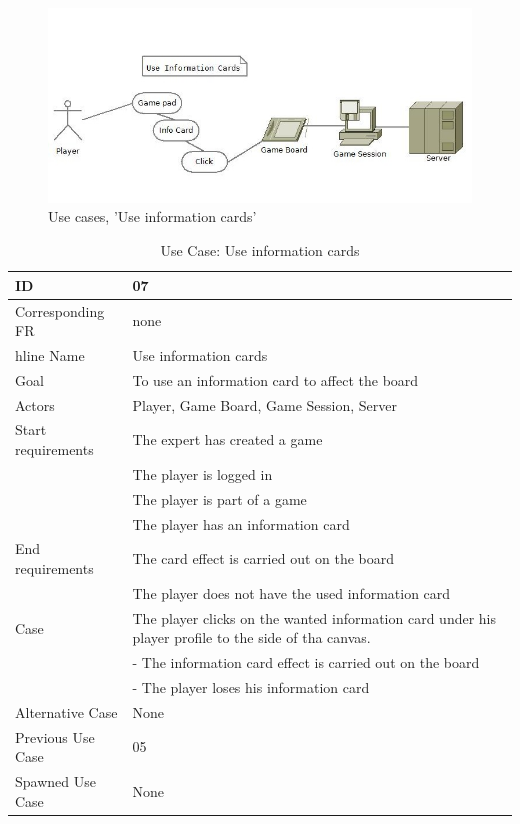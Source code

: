 \begin{figure}[H]
  \centering
    \includegraphics[width=1.0\textwidth]{img/useinfocards.jpg}
  \caption{Use cases, 'Use information cards'} 
  \label{fig:useinformationcards}
\end{figure}


\begin{table}[H]
\begin{tabular}{|l|p{14cm}|}
\hline
	\textbf{ID} & \textbf{07}\\ \hline
	Corresponding FR & none\\hline
	Name & Use information cards\\ \hline
	Goal & To use an information card to affect the board\\ \hline
	Actors & Player, Game Board, Game Session, Server\\ \hline
	Start requirements & The expert has created a game\\
				& The player is logged in\\
				& The player is part of a game\\
				& The player has an information card \\ \hline
	End requirements & The card effect is carried out on the board\\
				& The player does not have the used information card \\ \hline
	Case & The player clicks on the wanted information card under his player profile to the side of tha canvas.\\
		&- The information card effect is carried out on the board\\
		&- The player loses his information card \\ \hline
	Alternative Case & None \\ \hline
	Previous Use Case & 05\\ \hline
	Spawned Use Case & None\\ \hline
\end{tabular}
\caption{Use Case: Use information cards}
\label{fig:usecase07table}
\end{table}



